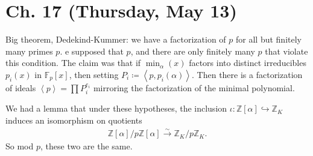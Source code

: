 \hypertarget{ch.-17-thursday-may-13}{%
\section{Ch. 17 (Thursday, May 13)}\label{ch.-17-thursday-may-13}}

\begin{remark}

Big theorem, Dedekind-Kummer: we have a factorization of \(p\) for all
but finitely many primes \(p\). e supposed that
\(p %
\), and there are only finitely many \(p\) that violate this condition.
The claim was that if \(\min_\alpha(x)\) factors into distinct
irreducibles \(p_i(x)\) in \({\mathbb{F}}_p[x]\), then setting
\(P_i \coloneqq\left\langle{ p, p_i( \alpha) }\right\rangle\). Then
there is a factorization of ideals
\(\left\langle{ p }\right\rangle = \prod P_i^{e_i}\) mirroring the
factorization of the minimal polynomial.

We had a lemma that under these hypotheses, the inclusion
\(\iota: {\mathbb{Z}}[ \alpha] \hookrightarrow{\mathbb{Z}}_K\) induces
an isomorphism on quotients
\begin{align*}
{\mathbb{Z}}[ \alpha] / p {\mathbb{Z}}[ \alpha] \xrightarrow{\sim} {\mathbb{Z}}_K / p{\mathbb{Z}}_K
.\end{align*}
So mod \(p\), these two are the same.

\end{remark}

